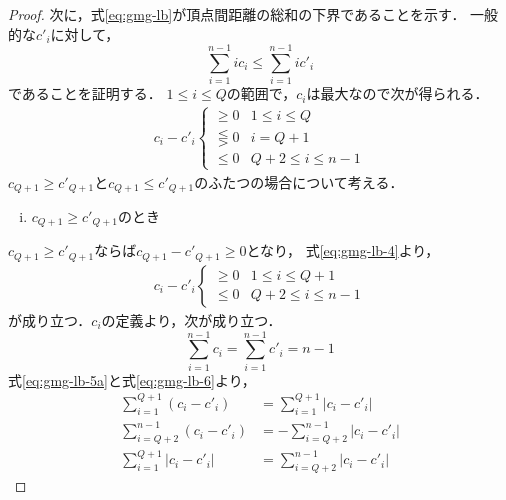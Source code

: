 \begin{proof}
  次に，式\ref{eq:gmg-lb}が頂点間距離の総和の下界であることを示す．
  一般的な$c'_i$に対して，
  \begin{equation}
    \label{eq:gmg-lb-3}
    \sum_{i=1}^{n-1}i c_i \leq \sum_{i=1}^{n-1}i c'_i
  \end{equation}
  であることを証明する．
  $1\leq i\leq Q$の範囲で，$c_i$は最大なので次が得られる．
  \begin{equation}
    \label{eq:gmg-lb-4}
    \begin{aligned}
      c_i - c'_i
      \begin{cases}
        \geq 0 & 1\leq i\leq Q \\
        \lesseqgtr 0 & i = Q+1 \\
        \leq 0 & Q+2\leq i\leq n-1
      \end{cases}
    \end{aligned}
  \end{equation}
  $c_{Q+1}\geq c'_{Q+1}$と$c_{Q+1}\leq c'_{Q+1}$のふたつの場合について考える．
  \begin{enumerate}[(i)]
  \item $c_{Q+1}\geq c'_{Q+1}$のとき
  \end{enumerate}
  $c_{Q+1}\geq c'_{Q+1}$ならば$c_{Q+1}-c'_{Q+1}\geq0$となり，
  式\ref{eq:gmg-lb-4}より，
  \begin{equation}
    \label{eq:gmg-lb-5a}
    \begin{aligned}
      c_i-c'_i
      \begin{cases}
        \geq 0 & 1\leq i\leq Q+1 \\
        \leq 0 & Q+2\leq i\leq n-1
      \end{cases}
    \end{aligned}
  \end{equation}
  が成り立つ．$c_i$の定義より，次が成り立つ．
  \begin{equation}
    \label{eq:gmg-lb-6}
    \sum_{i=1}^{n-1}c_i = \sum_{i=1}^{n-1}c'_i = n-1
  \end{equation}
  式\ref{eq:gmg-lb-5a}と式\ref{eq:gmg-lb-6}より，
  \begin{equation}
    \label{eq:gmg-lb-7a}
    \begin{aligned}
      \sum_{i=1}^{Q+1}(c_i-c'_i) &= \sum_{i=1}^{Q+1}|c_i-c'_i| \\
      \sum_{i=Q+2}^{n-1}(c_i-c'_i) &= -\sum_{i=Q+2}^{n-1}|c_i-c'_i| \\
      \sum_{i=1}^{Q+1}|c_i-c'_i| &= \sum_{i=Q+2}^{n-1}|c_i-c'_i|
    \end{aligned}
  \end{equation}

\end{proof}
